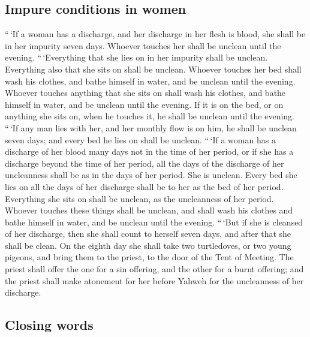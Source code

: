 \hypertarget{impure-conditions-in-women}{%
\subsection{Impure conditions in
women}\label{impure-conditions-in-women}}

 ``\,`If a woman has a discharge, and her discharge in
her flesh is blood, she shall be in her impurity seven days. Whoever
touches her shall be unclean until the evening. 
``\,`Everything that she lies on in her impurity shall be unclean.
Everything also that she sits on shall be unclean. 
Whoever touches her bed shall wash his clothes, and bathe himself in
water, and be unclean until the evening.  Whoever touches
anything that she sits on shall wash his clothes, and bathe himself in
water, and be unclean until the evening.  If it is on the
bed, or on anything she sits on, when he touches it, he shall be unclean
until the evening.  ``\,`If any man lies with her, and
her monthly flow is on him, he shall be unclean seven days; and every
bed he lies on shall be unclean.  ``\,`If a woman has a
discharge of her blood many days not in the time of her period, or if
she has a discharge beyond the time of her period, all the days of the
discharge of her uncleanness shall be as in the days of her period. She
is unclean.  Every bed she lies on all the days of her
discharge shall be to her as the bed of her period. Everything she sits
on shall be unclean, as the uncleanness of her period. 
Whoever touches these things shall be unclean, and shall wash his
clothes and bathe himself in water, and be unclean until the evening.
 ``\,`But if she is cleansed of her discharge, then she
shall count to herself seven days, and after that she shall be clean.
 On the eighth day she shall take two turtledoves, or two
young pigeons, and bring them to the priest, to the door of the Tent of
Meeting.  The priest shall offer the one for a sin
offering, and the other for a burnt offering; and the priest shall make
atonement for her before Yahweh for the uncleanness of her discharge.

\hypertarget{closing-words}{%
\subsection{Closing words}\label{closing-words}}

